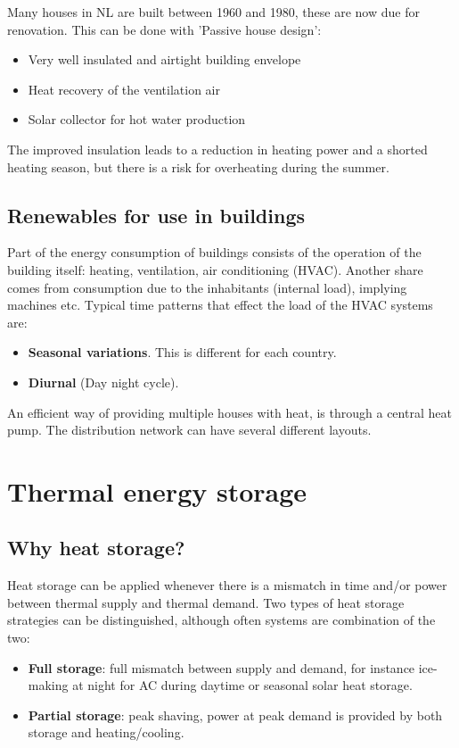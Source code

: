 \documentclass[a4paper,10pt]{article}
\begin{document}
Many houses in NL are built between 1960 and 1980, these are now due for renovation. This can be done with 'Passive house design':
\begin{itemize}
 \item Very well insulated and airtight building envelope
 \item Heat recovery of the ventilation air
 \item Solar collector for hot water production
\end{itemize}
The improved insulation leads to a reduction in heating power and a shorted heating season, but there is a risk for overheating during the summer.

\subsection{Renewables for use in buildings}
Part of the energy consumption of buildings consists of the operation of the building itself: heating, ventilation, air conditioning (HVAC). Another share comes from consumption due to the inhabitants (internal load), implying machines etc. Typical time patterns that effect the load of the HVAC systems are:
\begin{itemize}
 \item \textbf{Seasonal variations}. This is different for each country. 
 \item \textbf{Diurnal} (Day night cycle). 
\end{itemize}

An efficient way of providing multiple houses with heat, is through a central heat pump. The distribution network can have several different layouts. 


\section{Thermal energy storage}

\subsection{Why heat storage?}
Heat storage can be applied whenever there is a mismatch in time and/or power between thermal supply and thermal demand. Two types of heat storage strategies can be distinguished, although often systems are combination of the two:
\begin{itemize}
 \item \textbf{Full storage}: full mismatch between supply and demand, for instance ice-making at night for AC during daytime or seasonal solar heat storage.
 \item \textbf{Partial storage}: peak shaving, power at peak demand is provided by both storage and heating/cooling.
\end{itemize}
\end{document}

